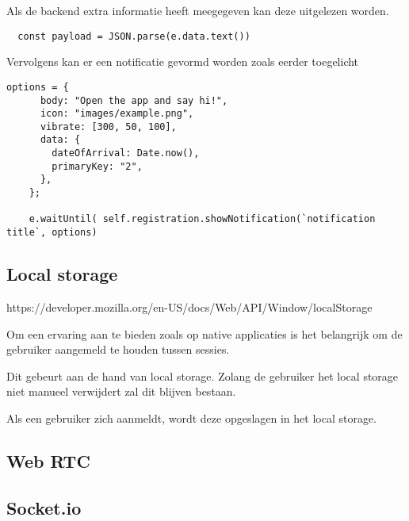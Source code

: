 			Als de backend extra informatie heeft meegegeven kan deze uitgelezen worden.
\begin{lstlisting}
  const payload = JSON.parse(e.data.text())
\end{lstlisting}
			
			Vervolgens kan er een notificatie gevormd worden zoals eerder toegelicht
			
\begin{lstlisting}
options = {
      body: "Open the app and say hi!",
      icon: "images/example.png",
      vibrate: [300, 50, 100],
      data: {
        dateOfArrival: Date.now(),
        primaryKey: "2",
      },
    };

    e.waitUntil( self.registration.showNotification(`notification title`, options)
\end{lstlisting}
			
	\subsection{Local storage}
	
		https://developer.mozilla.org/en-US/docs/Web/API/Window/localStorage
		
		Om een ervaring aan te bieden zoals op native applicaties is het belangrijk om de gebruiker aangemeld te houden tussen sessies.
		
		Dit gebeurt aan de hand van local storage. Zolang de gebruiker het local storage niet manueel verwijdert zal dit blijven bestaan. 
		
		Als een gebruiker zich aanmeldt, wordt deze opgeslagen in het local storage.
		


	\subsection{Web RTC}
	
	\subsection{Socket.io}
